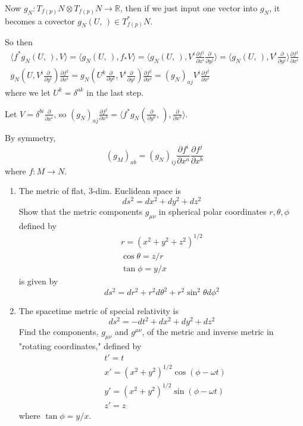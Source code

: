 Now $g_N : T_{f(p)}N \otimes T_{f(p)} N \to \mathbb{R}$, then if we just input one vector into $g_N$, it becomes a covector $g_N(U, \,) \in T^*_{f(p)} N$.

So then
\[
\begin{gathered}
	\langle f^* g_N(U, \, ) , V \rangle = \langle g_N(U, \, ) , f_* V\rangle = \langle g_N(U, \, ) , V^i \frac{ \partial f^j}{ \partial x^i} \frac{ \partial }{ \partial y^j} \rangle = \langle g_N(U, \, ) , V^i \frac{ \partial }{ \partial y^j} \rangle \frac{ \partial f^j }{ \partial x^i} \\
g_N(U, V^i \frac{ \partial }{ \partial y^i } ) \frac{ \partial f^j}{\partial x^i} = g_N(U^k \frac{ \partial }{ \partial y^k}, V^i \frac{ \partial }{ \partial y^j} ) \frac{ \partial f^j}{\partial x^i} = (g_N)_{aj} V^i \frac{\partial f^j}{\partial x^i} 
\end{gathered}
\]
where we let $U^k = \delta^{ak}$ in the last step.

Let $V =\delta^{bi} \frac{\partial }{ \partial x^i} $, so $(g_N)_{aj} \frac{ \partial f^j}{\partial x^b} = \langle f^* g_N \left(\frac{\partial }{ \partial y^a} , \, \right), \frac{\partial }{ \partial x^b} \rangle $. 

By symmetry,
\begin{equation}
\boxed{ (g_M)_{ab} = (g_N)_{ij} \frac{ \partial f^i}{ \partial x^a } \frac{ \partial f^j}{\partial x^b} }
\end{equation}
where $f:M \to N$.


\begin{enumerate}
	\item[(a)] The metric of flat, 3-dim. Euclidean space is
	\[
	ds^2 = dx^2 + dy^2 + dz^2
	\]
	Show that the metric components $g_{\mu \nu}$ in spherical polar coordinates $r, \theta, \phi$ defined by
	\[
	\begin{gathered}
		r= (x^2 + y^2 + z^2)^{1/2} \\
		\cos{\theta}  =  z/r \\
		\tan{\phi} = y/x
	\end{gathered}
	\]
	is given by
	\[
	ds^2 = dr^2 + r^2 d\theta^2 + r^2 \sin^2{\theta} d\phi^2
	\]
	\item[(b)] The spacetime metric of special relativity is 
	\[
	ds^2 = -dt^2 + dx^2 + dy^2 + dz^2
	\]
	Find the components, $g_{\mu \nu}$ and $g^{\mu \nu}$, of the metric and inverse metric in "rotating coordinates," defined by
	\[
	\begin{aligned}
		& t' = t \\
		& x' = (x^2 + y^2)^{1/2} \cos{(\phi - \omega t)} \\
		& y' = (x^2 + y^2)^{1/2} \sin{(\phi - \omega t)} \\
		& z' =z
	\end{aligned}
	\]
	where $\tan{\phi} = y/x$.
\end{enumerate}

